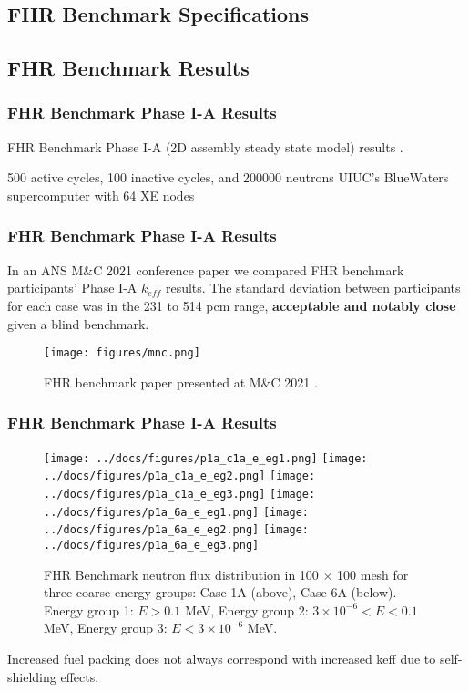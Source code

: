 \subsection{FHR Benchmark Specifications}

\subsection{FHR Benchmark Results}

\begin{frame}
    \frametitle{FHR Benchmark Phase I-A Results}
    \begin{table}
        \caption{FHR Benchmark Phase I-A (2D assembly steady state model) results 
        \cite{chee_arfcfhr-benchmark_2021}.}
    \end{table}
    500 active cycles, 100 inactive cycles, and 200000 neutrons
    UIUC's BlueWaters supercomputer with 64 XE nodes
\end{frame}

\begin{frame}
    \frametitle{FHR Benchmark Phase I-A Results}
    In an ANS M$\&$C 2021 conference paper we compared FHR benchmark participants' 
    Phase I-A $k_{eff}$ results. 
    The standard deviation between participants for each case was in the 231 to 514 
    pcm range, \textbf{acceptable and notably close} given a blind benchmark.

    \begin{figure}[]
        \centering
        \texttt{[image: figures/mnc.png]} 
        \caption{FHR benchmark paper presented at M$\&$C 2021 
        \cite{petrovic_preliminary_2021}.}
    \end{figure}
\end{frame}

\begin{frame}
    \frametitle{FHR Benchmark Phase I-A Results}
    \begin{figure}
        \centering
        \texttt{[image: ../docs/figures/p1a\_c1a\_e\_eg1.png]} 
        \texttt{[image: ../docs/figures/p1a\_c1a\_e\_eg2.png]} 
        \texttt{[image: ../docs/figures/p1a\_c1a\_e\_eg3.png]} 
        \texttt{[image: ../docs/figures/p1a\_6a\_e\_eg1.png]} 
        \texttt{[image: ../docs/figures/p1a\_6a\_e\_eg2.png]} 
        \texttt{[image: ../docs/figures/p1a\_6a\_e\_eg3.png]} 
        \vspace{-0.2cm}
        \caption{FHR Benchmark neutron flux 
        distribution in 100 $\times$ 100 mesh for three coarse energy groups: Case 
        1A (above), Case 6A (below). Energy group 1: $E > 0.1$ MeV, 
        Energy group 2: $3 \times 10^{-6} < E < 0.1$ MeV, Energy group 3: $E < 3 \times 10^{-6}$ MeV. }
    \end{figure}
    Increased fuel packing does not always correspond with increased keff due to self-shielding effects.
\end{frame}
